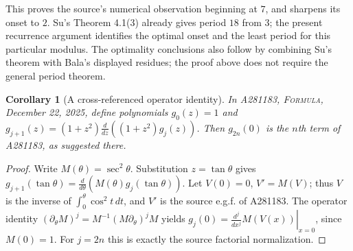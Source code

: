 \documentclass[11pt]{article}
\newtheorem{corollary}[theorem]{Corollary}
\begin{document}
This proves the source's numerical observation beginning at $7$, and
sharpens its onset to $2$. Su's Theorem 4.1(3) already gives period $18$
from $3$; the present recurrence argument identifies the optimal onset
and the least period for this particular modulus.
The optimality conclusions also follow by combining Su's theorem with
Bala's displayed residues; the proof above does not require the general
period theorem.

\begin{corollary}[A cross-referenced operator identity]\label{cor:operator}
In A281183, \textsc{Formula}, December 22, 2025, define polynomials
$g_0(z)=1$ and $g_{j+1}(z)=(1+z^2)\frac{d}{dz}((1+z^2)g_j(z))$.
Then $g_{2n}(0)$ is the $n$th term of A281183, as suggested there.
\end{corollary}
\begin{proof}
Write $M(\theta)=\sec^2\theta$. Substitution $z=\tan\theta$ gives
$g_{j+1}(\tan\theta)=\frac{d}{d\theta}(M(\theta)g_j(\tan\theta))$.
Let $V(0)=0$, $V'=M(V)$; thus $V$ is the inverse of
$\int_0^\theta\cos^2 t\,dt$, and $V'$ is the source e.g.f. of A281183.
The operator identity
$(\partial_\theta M)^j=M^{-1}(M\partial_\theta)^jM$ yields
$g_j(0)=\left.\frac{d^j}{dx^j}M(V(x))\right|_{x=0}$, since $M(0)=1$.
For $j=2n$ this is exactly the source factorial normalization.
\end{proof}
\end{document}
